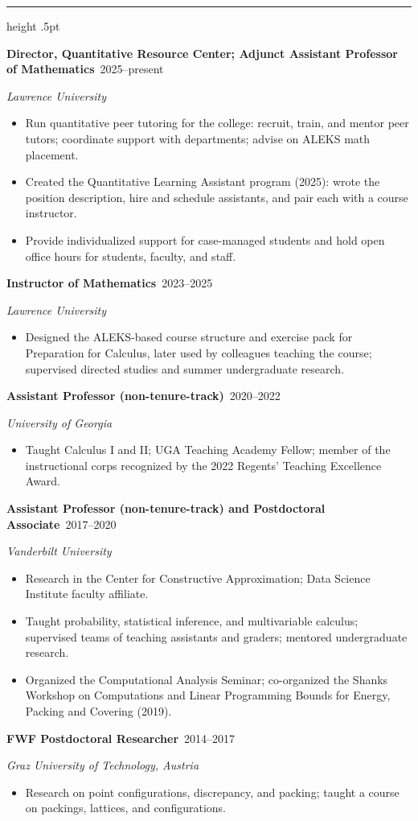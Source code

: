 \documentclass[11pt]{article}
\newcommand{\sect}[1]{\par\vspace{7pt}{\large\bfseries #1}\par\vspace{1pt}%
  {\color{rule}\hrule height .5pt}\vspace{4pt}}
\newcommand{\role}[3]{\par\vspace{3pt}\textbf{#1}\ \hfill\mbox{#3}\par   %
  {\itshape #2}\par}
\begin{document}
\sect{Experience}
\role{Director, Quantitative Resource Center; Adjunct Assistant Professor of Mathematics}{Lawrence University}{2025--present}
\begin{itemize}
  \item Run quantitative peer tutoring for the college: recruit, train, and mentor peer tutors; coordinate
        support with departments; advise on ALEKS math placement.
  \item Created the Quantitative Learning Assistant program (2025): wrote the position description, hire and
        schedule assistants, and pair each with a course instructor.
  \item Provide individualized support for case-managed students and hold open office hours for students,
        faculty, and staff.
\end{itemize}
\role{Instructor of Mathematics}{Lawrence University}{2023--2025}
\begin{itemize}
  \item Designed the ALEKS-based course structure and exercise pack for Preparation for Calculus, later used by
        colleagues teaching the course; supervised directed studies and summer undergraduate research.
\end{itemize}
\role{Assistant Professor (non-tenure-track)}{University of Georgia}{2020--2022}
\begin{itemize}
  \item Taught Calculus I and II; UGA Teaching Academy Fellow; member of the instructional corps recognized by
        the 2022 Regents' Teaching Excellence Award.
\end{itemize}
\role{Assistant Professor (non-tenure-track) and Postdoctoral Associate}{Vanderbilt University}{2017--2020}
\begin{itemize}
  \item Research in the Center for Constructive Approximation; Data Science Institute faculty affiliate.
  \item Taught probability, statistical inference, and multivariable calculus; supervised teams of teaching
        assistants and graders; mentored undergraduate research.
  \item Organized the Computational Analysis Seminar; co-organized the Shanks Workshop on Computations and
        Linear Programming Bounds for Energy, Packing and Covering (2019).
\end{itemize}
\role{FWF Postdoctoral Researcher}{Graz University of Technology, Austria}{2014--2017}
\begin{itemize}
  \item Research on point configurations, discrepancy, and packing; taught a course on packings, lattices,
        and configurations.
\end{itemize}
\end{document}
